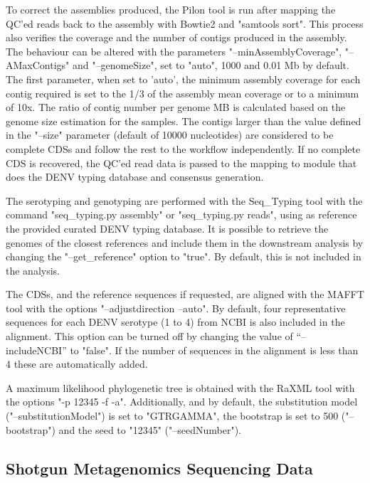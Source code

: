 To correct the assemblies produced, the Pilon tool \citep{walker_pilon_2014} is run after mapping the QC’ed reads back to the assembly with Bowtie2 and "samtools sort". This process also verifies the coverage and the number of contigs produced in the assembly. The behaviour can be altered with the parameters "–minAssemblyCoverage", "–AMaxContigs" and "–genomeSize", set to "auto", 1000 and 0.01 Mb by default. The first parameter, when set to ’auto’, the minimum assembly coverage for each contig required is set to the 1/3 of the assembly mean coverage or to a minimum of 10x. The ratio of contig number per genome MB is calculated based on the genome size estimation for the samples.
The contigs larger than the value defined in the "–size" parameter (default of 10000 nucleotides) are considered to be complete CDSs and follow the rest to the workflow independently. If no complete CDS is recovered, the QC’ed read data is passed to the mapping to module that does the DENV typing database and consensus generation. 

The serotyping and genotyping are performed with the Seq\_Typing tool \citep{machado_epidemiological_2017} with the command "seq\_typing.py assembly" or "seq\_typing.py reads", using as reference the provided curated DENV typing database. It is possible to retrieve the genomes of the closest references and include them in the downstream analysis by changing the "–get\_reference" option to "true". By default, this is not included in the analysis.

The CDSs, and the reference sequences if requested, are aligned with the MAFFT tool \citep{nakamura_parallelization_2018} with the options "–adjustdirection –auto". By default, four representative sequences for each DENV serotype (1 to 4) from NCBI is also included in the alignment. This option can be turned off by changing the value of “--includeNCBI” to "false". If the number of sequences in the alignment is less than 4 these are automatically added. 

A maximum likelihood phylogenetic tree is obtained with the RaXML tool \citep{stamatakis_raxml_2014} with the options "-p 12345 -f -a". Additionally, and by default, the substitution model ("–substitutionModel") is set to "GTRGAMMA", the bootstrap is set to 500 ("–bootstrap") and the seed to "12345" ("–seedNumber").

\subsection{Shotgun Metagenomics Sequencing Data} \label{chap4_sup_data}

